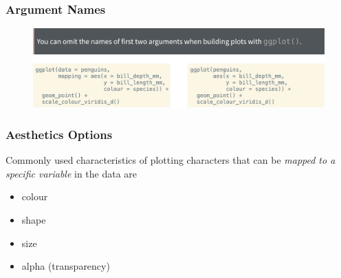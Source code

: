 \documentclass[11pt]{beamer}
\begin{document}
	\begin{frame}
	\frametitle{\textbf{Argument Names}}
		\begin{figure}
			\centering
			\includegraphics[width=1\linewidth]{Images/S2/code/s17}
			
		\end{figure}
	
\end{frame}
\begin{frame}
	\frametitle{\textbf{Aesthetics Options}}
	Commonly used characteristics of plotting characters that can be \textit{mapped to a specific variable} in the data are
	
\begin{itemize}
	\item colour
	\item shape
	\item size
	\item alpha (transparency)
\end{itemize}
	
\end{frame}
\end{document}
